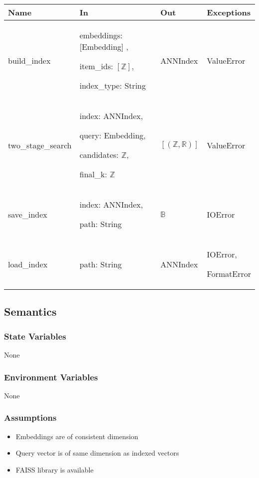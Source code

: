 \documentclass[12pt, titlepage]{article}
\begin{document}
\begin{center}
  \begin{tabular}{p{4cm} p{4cm} p{4cm} p{3cm}}
  \hline
  \textbf{Name} & \textbf{In} & \textbf{Out} & \textbf{Exceptions} \\
  \hline
  build\_index & embeddings: [Embedding] ,
  
  item\_ids: $[\mathbb{Z}]$,
  
  index\_type: String & ANNIndex & ValueError \\
  \hline
  two\_stage\_search & index: ANNIndex,
  
  query: Embedding,
  
  candidates: $\mathbb{Z}$,
  
  final\_k: $\mathbb{Z}$
   & $[(\mathbb{Z}, \mathbb{R})]$ & ValueError \\
  \hline
  save\_index & index: ANNIndex, 
  
  path: String & $\mathbb{B}$ & IOError \\
  \hline
  load\_index & path: String 
   & ANNIndex & IOError, 
   
   FormatError \\
  \hline
  \end{tabular}
  \end{center}

\subsection{Semantics}

\subsubsection{State Variables}
None

\subsubsection{Environment Variables}

None

\subsubsection{Assumptions}

\begin{itemize}
  \item Embeddings are of consistent dimension
  \item Query vector is of same dimension as indexed vectors
  \item FAISS library is available
\end{itemize}
\end{document}
